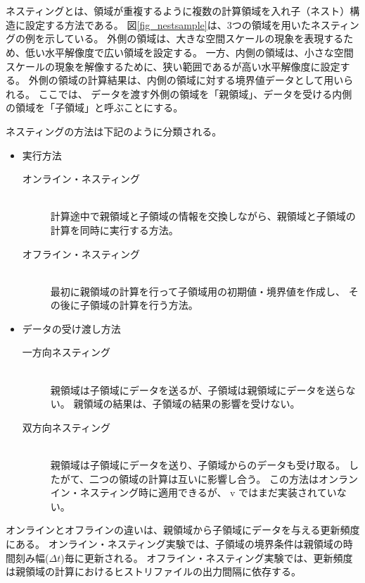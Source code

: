 \section{\SecAdvanceNesting} \label{sec:nest_exp}

ネスティングとは、領域が重複するように複数の計算領域を入れ子（ネスト）構造に設定する方法である。
図\ref{fig_nestsample}は、3つの領域を用いたネスティングの例を示している。
外側の領域は、大きな空間スケールの現象を表現するため、低い水平解像度で広い領域を設定する。
一方、内側の領域は、小さな空間スケールの現象を解像するために、狭い範囲であるが高い水平解像度に設定する。
外側の領域の計算結果は、内側の領域に対する境界値データとして用いられる。
ここでは、
データを渡す外側の領域を「親領域」、データを受ける内側の領域を「子領域」と呼ぶことにする。

ネスティングの方法は下記のように分類される。
\begin{itemize}
\item 実行方法
\begin{description}
 \item[オンライン・ネスティング]\mbox{}\\
計算途中で親領域と子領域の情報を交換しながら、親領域と子領域の計算を同時に実行する方法。
 \item[オフライン・ネスティング]\mbox{}\\
最初に親領域の計算を行って子領域用の初期値・境界値を作成し、
その後に子領域の計算を行う方法。
\end{description}
\item データの受け渡し方法
\begin{description}
 \item[一方向ネスティング]\mbox{}\\
親領域は子領域にデータを送るが、子領域は親領域にデータを送らない。
親領域の結果は、子領域の結果の影響を受けない。
 \item[双方向ネスティング]\mbox{}\\
親領域は子領域にデータを送り、子領域からのデータも受け取る。
したがて、二つの領域の計算は互いに影響し合う。
この方法はオンランイン・ネスティング時に適用できるが、
{\scalerm} v{\version} ではまだ実装されていない。
\end{description}
\end{itemize}

オンラインとオフラインの違いは、親領域から子領域にデータを与える更新頻度にある。
オンライン・ネスティング実験では、子領域の境界条件は親領域の時間刻み幅($\Delta t$)毎に更新される。
オフライン・ネスティング実験では、更新頻度は親領域の計算におけるヒストリファイルの出力間隔に依存する。

